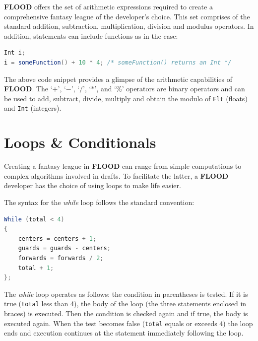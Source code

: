 \documentclass[12pt]{report}
\begin{document}
\textbf{FLOOD} offers the set of arithmetic expressions required to create a comprehensive fantasy league of the developer's choice. This set comprises of the standard addition, subtraction, multiplication, division and modulus operators. In addition, statements can include functions as in the case:

\begin{singlespace}
\begin{lstlisting}[language=Java,label=some-code,caption={Function used in an arithmetic statement.}]
Int i;
i = someFunction() + 10 * 4; /* someFunction() returns an Int */
\end{lstlisting}
\end{singlespace}

The above code snippet provides a glimpse of the arithmetic capabilities of \textbf{FLOOD}. The `$+$', `$-$', `$/$', `$*$', and `\%' operators are binary operators and can be used to add, subtract, divide, multiply and obtain the modulo of \texttt{Flt} (floats) and \texttt{Int} (integers).

\section{Loops \& Conditionals}

Creating a fantasy league in \textbf{FLOOD} can range from simple computations to complex algorithms involved in drafts. To facilitate the latter, a \textbf{FLOOD} developer has the choice of using loops to make life easier.

The syntax for the \textit{while} loop follows the standard convention:

\begin{singlespace}
\begin{lstlisting}[language=Java,label=some-code,caption={\textit{while} loop}]
While (total < 4)
{
	centers = centers + 1;
	guards = guards - centers;
	forwards = forwards / 2;
	total + 1;
};
\end{lstlisting}
\end{singlespace}

The \textit{while} loop operates as follows: the condition in parentheses is tested. If it is true (\texttt{total} less than 4), the body of the loop (the three statements enclosed in braces) is executed. Then the condition is checked again and if true, the body is executed again. When the test becomes false (\texttt{total} equals or exceeds 4) the loop ends and execution continues at the statement immediately following the loop. 
\end{document}
